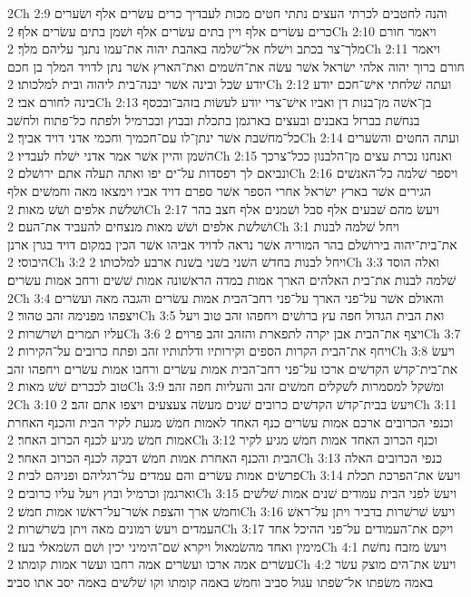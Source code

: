 2Ch 2:9  והנה לחטבים לכרתי העצים נתתי חטים מכות לעבדיך כרים עשׂרים אלף ושׂערים כרים עשׂרים אלף ויין בתים עשׂרים אלף ושׁמן בתים עשׂרים אלף׃
2Ch 2:10  ויאמר חורם מלך־צר בכתב וישׁלח אל־שׁלמה באהבת יהוה את־עמו נתנך עליהם מלך׃
2Ch 2:11  ויאמר חורם ברוך יהוה אלהי ישׂראל אשׁר עשׂה את־השׁמים ואת־הארץ אשׁר נתן לדויד המלך בן חכם יודע שׂכל ובינה אשׁר יבנה־בית ליהוה ובית למלכותו׃
2Ch 2:12  ועתה שׁלחתי אישׁ־חכם יודע בינה לחורם אבי׃
2Ch 2:13  בן־אשׁה מן־בנות דן ואביו אישׁ־צרי יודע לעשׂות בזהב־ובכסף בנחשׁת בברזל באבנים ובעצים בארגמן בתכלת ובבוץ ובכרמיל ולפתח כל־פתוח ולחשׁב כל־מחשׁבת אשׁר ינתן־לו עם־חכמיך וחכמי אדני דויד אביך׃
2Ch 2:14  ועתה החטים והשׂערים השׁמן והיין אשׁר אמר אדני ישׁלח לעבדיו׃
2Ch 2:15  ואנחנו נכרת עצים מן־הלבנון ככל־צרכך ונביאם לך רפסדות על־ים יפו ואתה תעלה אתם ירושׁלם׃
2Ch 2:16  ויספר שׁלמה כל־האנשׁים הגירים אשׁר בארץ ישׂראל אחרי הספר אשׁר ספרם דויד אביו וימצאו מאה וחמשׁים אלף ושׁלשׁת אלפים ושׁשׁ מאות׃
2Ch 2:17  ויעשׂ מהם שׁבעים אלף סבל ושׁמנים אלף חצב בהר ושׁלשׁת אלפים ושׁשׁ מאות מנצחים להעביד את־העם׃
2Ch 3:1  ויחל שׁלמה לבנות את־בית־יהוה בירושׁלם בהר המוריה אשׁר נראה לדויד אביהו אשׁר הכין במקום דויד בגרן ארנן היבוסי׃
2Ch 3:2  ויחל לבנות בחדשׁ השׁני בשׁני בשׁנת ארבע למלכותו׃
2Ch 3:3  ואלה הוסד שׁלמה לבנות את־בית האלהים הארך אמות במדה הראשׁונה אמות שׁשׁים ורחב אמות עשׂרים׃
2Ch 3:4  והאולם אשׁר על־פני הארך על־פני רחב־הבית אמות עשׂרים והגבה מאה ועשׂרים ויצפהו מפנימה זהב טהור׃
2Ch 3:5  ואת הבית הגדול חפה עץ ברושׁים ויחפהו זהב טוב ויעל עליו תמרים ושׁרשׁרות׃
2Ch 3:6  ויצף את־הבית אבן יקרה לתפארת והזהב זהב פרוים׃
2Ch 3:7  ויחף את־הבית הקרות הספים וקירותיו ודלתותיו זהב ופתח כרובים על־הקירות׃
2Ch 3:8  ויעשׂ את־בית־קדשׁ הקדשׁים ארכו על־פני רחב־הבית אמות עשׂרים ורחבו אמות עשׂרים ויחפהו זהב טוב לככרים שׁשׁ מאות׃
2Ch 3:9  ומשׁקל למסמרות לשׁקלים חמשׁים זהב והעליות חפה זהב׃
2Ch 3:10  ויעשׂ בבית־קדשׁ הקדשׁים כרובים שׁנים מעשׂה צעצעים ויצפו אתם זהב׃
2Ch 3:11  וכנפי הכרובים ארכם אמות עשׂרים כנף האחד לאמות חמשׁ מגעת לקיר הבית והכנף האחרת אמות חמשׁ מגיע לכנף הכרוב האחר׃
2Ch 3:12  וכנף הכרוב האחד אמות חמשׁ מגיע לקיר הבית והכנף האחרת אמות חמשׁ דבקה לכנף הכרוב האחר׃
2Ch 3:13  כנפי הכרובים האלה פרשׂים אמות עשׂרים והם עמדים על־רגליהם ופניהם לבית׃
2Ch 3:14  ויעשׂ את־הפרכת תכלת וארגמן וכרמיל ובוץ ויעל עליו כרובים׃
2Ch 3:15  ויעשׂ לפני הבית עמודים שׁנים אמות שׁלשׁים וחמשׁ ארך והצפת אשׁר־על־ראשׁו אמות חמשׁ׃
2Ch 3:16  ויעשׂ שׁרשׁרות בדביר ויתן על־ראשׁ העמדים ויעשׂ רמונים מאה ויתן בשׁרשׁרות׃
2Ch 3:17  ויקם את־העמודים על־פני ההיכל אחד מימין ואחד מהשׂמאול ויקרא שׁם־הימיני יכין ושׁם השׂמאלי בעז׃
2Ch 4:1  ויעשׂ מזבח נחשׁת עשׂרים אמה ארכו ועשׂרים אמה רחבו ועשׂר אמות קומתו׃
2Ch 4:2  ויעשׂ את־הים מוצק עשׂר באמה משׂפתו אל־שׂפתו עגול סביב וחמשׁ באמה קומתו וקו שׁלשׁים באמה יסב אתו סביב׃
